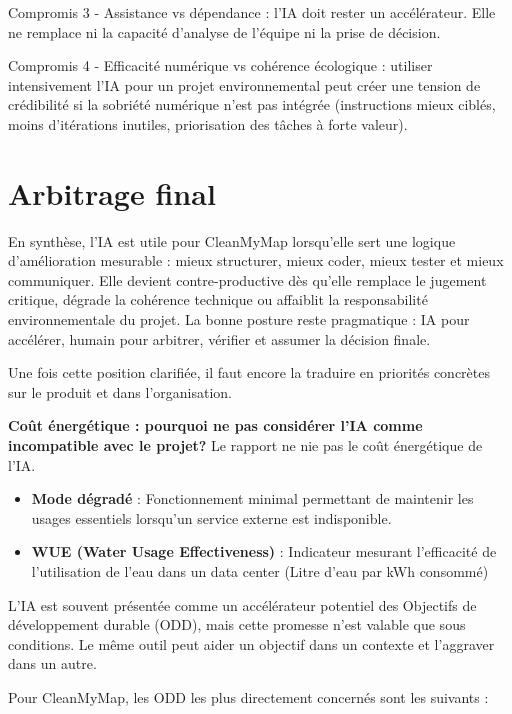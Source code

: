 \documentclass[
  10pt,
  a4paper,
  DIV=11,
  numbers=noendperiod,
  oneside]{scrreprt}
\let\oldtextbf\textbf
\renewcommand{\textbf}[1]{\oldtextbf{\textcolor{cmmnavy}{#1}}}
\begin{document}
Compromis 3 - Assistance vs dépendance : l'IA doit rester un
accélérateur. Elle ne remplace ni la capacité d'analyse de l'équipe ni
la prise de décision.

Compromis 4 - Efficacité numérique vs cohérence écologique : utiliser
intensivement l'IA pour un projet environnemental peut créer une tension
de crédibilité si la sobriété numérique n'est pas intégrée (instructions
mieux ciblés, moins d'itérations inutiles, priorisation des tâches à
forte valeur).

\section{Arbitrage final}\label{arbitrage-final}

En synthèse, l'IA est utile pour CleanMyMap lorsqu'elle sert une logique
d'amélioration mesurable : mieux structurer, mieux coder, mieux tester
et mieux communiquer. Elle devient contre-productive dès qu'elle
remplace le jugement critique, dégrade la cohérence technique ou
affaiblit la responsabilité environnementale du projet. La bonne posture
reste pragmatique : IA pour accélérer, humain pour arbitrer, vérifier et
assumer la décision finale.

Une fois cette position clarifiée, il faut encore la traduire en
priorités concrètes sur le produit et dans l'organisation.

\textbf{Coût énergétique : pourquoi ne pas considérer l'IA comme
incompatible avec le projet?} Le rapport ne nie pas le coût énergétique
de l'IA.

\begin{itemize}
\item
  \textbf{Mode dégradé} : Fonctionnement minimal permettant de maintenir
  les usages essentiels lorsqu'un service externe est indisponible.
\item
  \textbf{WUE (Water Usage Effectiveness)} : Indicateur mesurant
  l'efficacité de l'utilisation de l'eau dans un data center (Litre
  d'eau par kWh consommé)
\end{itemize}

L'IA est souvent présentée comme un accélérateur potentiel des Objectifs
de développement durable (ODD), mais cette promesse n'est valable que
sous conditions. Le même outil peut aider un objectif dans un contexte
et l'aggraver dans un autre.

Pour CleanMyMap, les ODD les plus directement concernés sont les
suivants :
\end{document}
